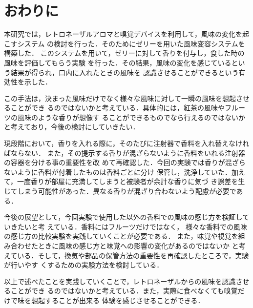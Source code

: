 \section{おわりに}

本研究では，レトロネーザルアロマと嗅覚デバイスを利用して，風味の変化を起こすシステム
の検討を行った．そのためにゼリーを用いた風味変容システムを構築した．
このシステムを用いて，ゼリーに対して香りを付与し，食した時の風味を評価してもらう実験
を行った．その結果，風味の変化を感じているという結果が得られ，口内に入れたときの風味を
認識させることができるという有効性を示した．


この手法は，決まった風味だけでなく様々な風味に対して一瞬の風味を想起させることができ
るのではないかと考えている．具体的には，紅茶の風味やフルーツの風味のような香りが想像す
ることができるものでなら行えるのではないかと考えており，今後の検討にしていきたい．


現段階において，香りを入れる際に，そのたびに注射器で香料を入れ替えなければならない．
また，その提示する香りが混ざらないように香料をいれる注射器の容器を分ける事の重要性を改
めて再確認した．今回の実験では香りが混ざらないように香料が付着したものは香料ごとに分け
保管し，洗浄していた．加えて，一度香りが部屋に充満してしまうと被験者が余計な香りに気づ
き誤差を生じてしまう可能性があった．異なる香りが混ざり合わないよう配慮が必要である．


今後の展望として，今回実験で使用した以外の香料での風味の感じ方を検証していきたいと考
えている．香料にはフルーツだけではなく，
様々な香料での風味の感じ方の比較実験を実践していくことが必要である．
また，味覚や視覚を組み合わせたときに風味の感じ方と味覚への影響の変化があるのではないか
と考えている．そして，換気や部品の保管方法の重要性を再確認したところで，実験が行いやす
くするための実験方法を検討している．


以上で述べたことを実践していくことで，レトロネーザルからの風味を認識させることができ
るのではないかと考えている．また，実際に食べなくても嗅覚だけで味を想起することが出来る
体験を感じさせることができる．
